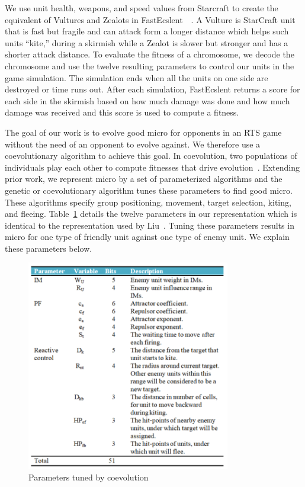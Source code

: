 \documentclass[conference,10pt]{IEEEtran}
\begin{document}
We use unit health, weapons, and speed values from
Starcraft to create the equivalent of Vultures and Zealots in
FastEcslent~\cite{website2013}~\cite{heinermann2012bwapi}.  A Vulture is StarCraft unit
that is fast but fragile and can attack form a longer distance which
helps such units ``kite,'' during a skirmish while a Zealot is slower
but stronger and has a shorter attack distance. To evaluate the
fitness of a chromosome, we decode the chromosome and use the twelve
resulting parameters to control our units in the game simulation. The
simulation ends when all the units on one side are destroyed or time
runs out. After each simulation, FastEcslent returns a score for each
side in the skirmish based on how much damage was done and how much
damage was received and this score is used to compute a fitness.

The goal of our work is to evolve good micro for opponents in an RTS
game without the need of an opponent to evolve against. We therefore
use a coevolutionary algorithm to achieve this goal. In coevolution,
two populations of individuals play each other to compute fitnesses
that drive evolution~\cite{NMFCC97}. Extending prior work, we
represent micro by a set of parameterized algorithms and the genetic or
coevolutionary algorithm tunes these parameters to find good
micro. These algorithms specify group positioning, movement, target
selection, kiting, and fleeing.  Table~\ref{TwelveParameters} details
the twelve parameters in our representation which is identical to the
representation used by Liu~\cite {EEMIRSG16}. Tuning these parameters
results in micro for one type of friendly unit against one type of
enemy unit. We explain these parameters below.

\begin{figure}
\centerline{
 \includegraphics[width=3.5in]{fig2.png}
}
\caption{Parameters tuned by coevolution}
\label{TwelveParameters}
\end{figure}
\end{document}
